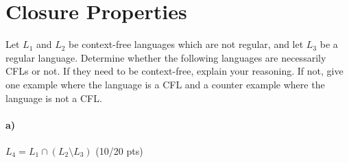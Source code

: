 \documentclass[a4paper,12pt]{article}
\begin{document}
\newpage
\section{Closure Properties \hfill {}}

Let $L_1$ and $L_2$ be context-free languages which are not regular, and let $L_3$ be a regular language. Determine whether the following languages are necessarily CFLs or not. If they need to be context-free, explain your reasoning. If not, give one example where the language is a CFL and a counter example where the language is not a CFL. \\

\paragraph{a)} $L_4 = L_1 \cap (L_2 \setminus L_3)$ \hfill \small{(10/20 pts)} \\
\end{document}
